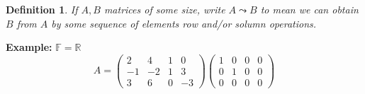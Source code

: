\documentclass[12pt]{article}
\newtheorem{definition}{Definition}[subsection]
\newcommand{\mR}{{\mathbb{R}}}
\newcommand{\mF}{{\mathbb{F}}}
\begin{document}
	\begin{definition}
		If $A, B$ matrices of some size, write $A \leadsto B$ to mean we can
		obtain $B$ from $A$ by some sequence of elements row and/or solumn 
		operations. 
	\end{definition}

	{\color{Brown}
	\textbf{Example: } $\mF= \mR$
	\[
		A = 
		\begin{pmatrix}
			2	& 4	& 1 & 0\\
			-1	& -2& 1 & 3\\
			3 & 6 & 0 & -3 
		\end{pmatrix}
		\begin{pmatrix}
			1 & 0 & 0 & 0\\
			0 & 1 & 0 & 0\\
			0 & 0 & 0 & 0
		\end{pmatrix}
	\]
	
}
\end{document}
